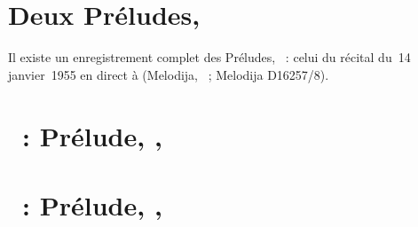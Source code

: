 \section*{%
Deux Préludes, }

Il existe un enregistrement complet des Préludes, ~: celui du
récital du~14 janvier~1955 en direct à \MCGH (Melodija, ~; Melodija
D16257/8).

\section{\ifChrono \Scriabine{}~: \fi
Prélude,  , }
\label{\thesection}

\begin{workitemize}
 \item{}
 \begin{perfitemize}
  \item{}
  \item{}
 \end{perfitemize}
 \item{}
 \begin{perfitemize}
  \item\NoEdition{}
 \end{perfitemize}
 \item{}
 \begin{perfitemize}
  \item{}
 \end{perfitemize}
\end{workitemize}

\section{\ifChrono \Scriabine{}~: \fi
Prélude,  , }
\label{\thesection}

\begin{workitemize}
 \item{}
 \begin{perfitemize}
  \item{}
  \item{}
 \end{perfitemize}
 \item{}
 \begin{perfitemize}
  \item\NoEdition{}
 \end{perfitemize}
\end{workitemize}

